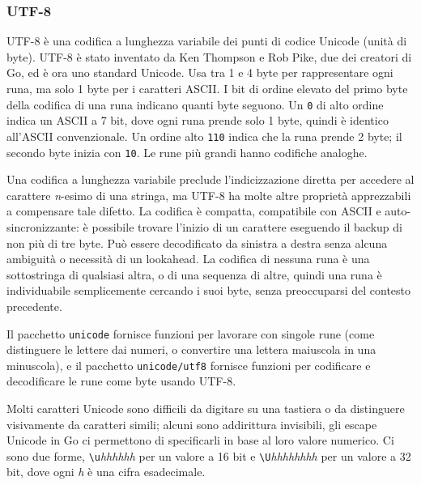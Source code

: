 \documentclass[../../../thesis.tex]{subfiles}
\begin{document}
    \subsubsection{UTF-8}
    UTF-8 è una codifica a lunghezza variabile dei punti di codice Unicode (unità di byte).
    UTF-8 è stato inventato da Ken Thompson e Rob Pike, due dei creatori di Go, ed è ora uno standard Unicode.
    Usa tra 1 e 4 byte per rappresentare ogni runa, ma solo 1 byte per i caratteri ASCII. I bit di ordine elevato del primo byte della codifica di una runa indicano quanti byte seguono.
    Un \verb"0" di alto ordine indica un ASCII a 7 bit, dove ogni runa prende solo 1 byte, quindi è identico all'ASCII convenzionale.
    Un ordine alto \verb"110" indica che la runa prende 2 byte;
    il secondo byte inizia con \verb|10|.
    Le rune più grandi hanno codifiche analoghe.
    \hfill \vspace{12pt}

    Una codifica a lunghezza variabile preclude l'indicizzazione diretta per accedere al carattere \textit{n}-esimo di una stringa, ma UTF-8 ha molte altre proprietà apprezzabili a compensare tale difetto.
    La codifica è compatta, compatibile con ASCII e auto-sincronizzante: è possibile trovare l'inizio di un carattere eseguendo il backup di non più di tre byte.
    Può essere decodificato da sinistra a destra senza alcuna ambiguità o necessità di un lookahead.
    La codifica di nessuna runa è una sottostringa di qualsiasi altra, o di una sequenza di altre, quindi una runa è individuabile semplicemente cercando i suoi byte, senza preoccuparsi del contesto precedente.
    \hfill \vspace{12pt}

    Il pacchetto \verb"unicode" fornisce funzioni per lavorare con singole rune (come distinguere le lettere dai numeri, o convertire una lettera maiuscola in una minuscola), e il pacchetto \verb"unicode/utf8" fornisce funzioni per codificare e decodificare le rune come byte usando UTF-8.
    \hfill \vspace{12pt}

    Molti caratteri Unicode sono difficili da digitare su una tastiera o da distinguere visivamente da caratteri simili;
    alcuni sono addirittura invisibili, gli escape Unicode in Go ci permettono di specificarli in base al loro valore numerico.
    Ci sono due forme, \verb"\u"\textit{hhhhhh} per un valore a 16 bit e \verb"\U"\textit{hhhhhhhh} per un valore a 32 bit, dove ogni \textit{h} è una cifra esadecimale.
\end{document}
